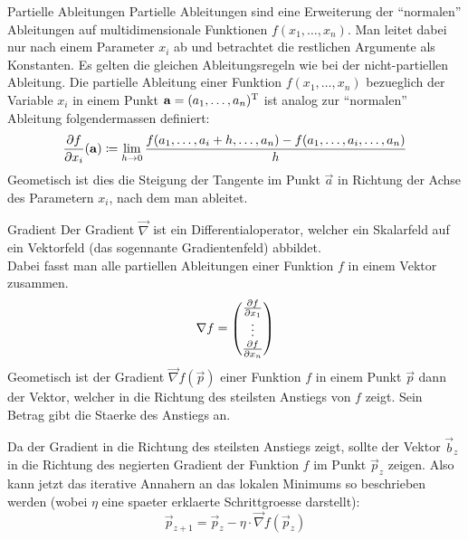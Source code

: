 \documentclass[../main]{subfiles}
\begin{document}
\begin{defbox}{Partielle Ableitungen}
  Partielle Ableitungen sind eine Erweiterung der ``normalen'' Ableitungen auf multidimensionale Funktionen $f(x_1,\ldots,x_n)$.
  Man leitet dabei nur nach einem Parameter $x_i$ ab und betrachtet die restlichen Argumente als Konstanten.
  Es gelten die gleichen Ableitungsregeln wie bei der nicht-partiellen Ableitung.
  Die partielle Ableitung einer Funktion $f(x_1,\ldots,x_n)$ bezueglich der Variable $x_i$ in einem Punkt $\mathbf{a}=(a_1,\ldots,a_n)^\mathrm{T}$ ist analog zur ``normalen'' Ableitung folgendermassen definiert:
  \begin{equation*}
    \frac{\partial f}{\partial x_i}(\mathbf{a}) \coloneqq \lim_{h \to 0} \frac{f(a_1,\ldots,a_i + h,\ldots,a_n)-f(a_1,\ldots,a_i,\ldots,a_n)}{h}
  \end{equation*}
  Geometisch ist dies die Steigung der Tangente im Punkt $\vec{a}$ in Richtung der Achse des Parametern $x_i$, nach dem man ableitet.
\end{defbox}

\para{}

\begin{defbox}{Gradient}
  Der Gradient $\vec{\nabla}$ ist ein Differentialoperator, welcher ein Skalarfeld auf ein Vektorfeld (das sogennante Gradientenfeld) abbildet.\\
  Dabei fasst man alle partiellen Ableitungen einer Funktion $f$ in einem Vektor zusammen.
  \begin{equation*}
    \mathbf{\nabla}f=
    \begin{pmatrix}
      \frac{\partial f}{\partial x_1} \\
      \vdots \\
      \frac{\partial f}{\partial x_n} \\
    \end{pmatrix}
  \end{equation*}
  Geometisch ist der Gradient $\vec{\nabla}f(\vec{p})$ einer Funktion $f$ in einem Punkt $\vec{p}$ dann der Vektor, welcher in die Richtung des steilsten Anstiegs von $f$ zeigt.
  Sein Betrag gibt die Staerke des Anstiegs an.
\end{defbox}

Da der Gradient in die Richtung des steilsten Anstiegs zeigt, sollte der Vektor $\vec{b}_z$ in die Richtung des negierten Gradient der Funktion $f$ im Punkt $\vec{p}_z$ zeigen.
Also kann jetzt das iterative Annahern an das lokalen Minimums so beschrieben
werden (wobei $\eta$ eine spaeter erklaerte Schrittgroesse darstellt):\\
\begin{equation}\label{eq:gradientdescent}
  \vec{p}_{z+1} = \vec{p}_z - \eta \cdot \vec{\nabla} \mathit{f}(\vec{p}_z)
\end{equation}
\end{document}
